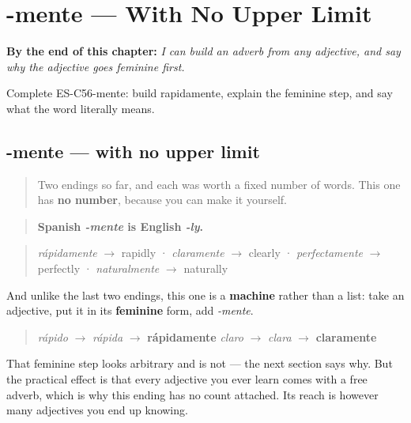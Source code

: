 
\chapter{-mente --- With No Upper Limit}
\label{ch:friend-mente}

\begin{chapteropening}
\textbf{By the end of this chapter:} \emph{I can build an adverb from any adjective, and say why the adjective goes feminine first.}

Complete ES-C56-mente: build rapidamente, explain the feminine step, and say what the word literally means.
\end{chapteropening}

\section[-mente]{-mente — with no upper limit}

\label{lesson:ES-C56-mente}



\begin{quote}
Two endings so far, and each was worth a fixed number of words. This one has \textbf{no number}, because you can make it yourself.
\end{quote}

\begin{grammarlens}[title={Grammar Lens: -mente is -ly}]
\begin{quote}
\textbf{Spanish \emph{-mente} is English \emph{-ly}.}
\end{quote}

\begin{quote}
\emph{rápidamente} $\to$ rapidly · \emph{claramente} $\to$ clearly · \emph{perfectamente} $\to$ perfectly · \emph{naturalmente} $\to$ naturally
\end{quote}

And unlike the last two endings, this one is a \textbf{machine} rather than a list: take an adjective, put it in its \textbf{feminine} form, add \emph{-mente}.

\begin{quote}
\emph{rápido} $\to$ \emph{rápida} $\to$ \textbf{rápidamente} \emph{claro} $\to$ \emph{clara} $\to$ \textbf{claramente}
\end{quote}

That feminine step looks arbitrary and is not — the next section says why. But the practical effect is that every adjective you ever learn comes with a free adverb, which is why this ending has no count attached. Its reach is however many adjectives you end up knowing.
\end{grammarlens}

